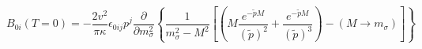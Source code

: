 \begin{equation}\label{nonplanar0}
B_{0i}(T=0)= - \frac{2 v^2}{ \pi \kappa} \epsilon_{0ij} p^j
\frac{\partial}{\partial m_{\sigma}^2} \left\{ \frac{1}{m_{\sigma}^2 -
M^2} \left[\left(M \frac{e^{- \tilde p M}}{(\tilde p )^2} + \frac{e^{-
\tilde p M}}{(\tilde p )^3}\right) - (M \rightarrow m_{\sigma}
)\right] \right\}
\end{equation}

